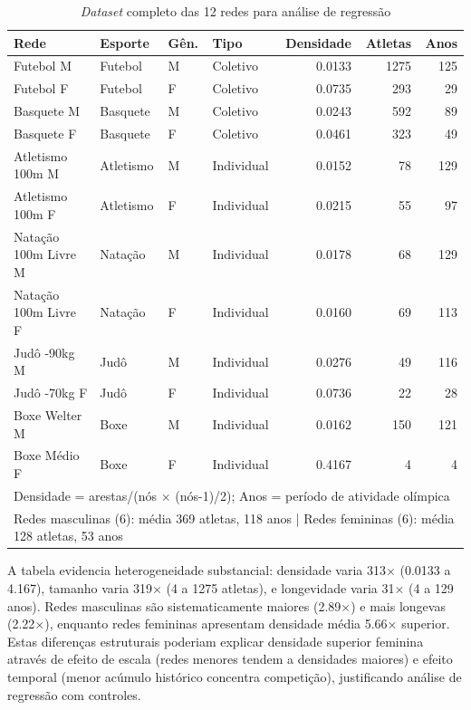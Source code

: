 \begin{table}[H]
\centering
\small
\caption{\textit{Dataset} completo das 12 redes para análise de regressão}
\label{tab:confounder_data}
\begin{tabular}{llllrrr}
\hline
\textbf{Rede} & \textbf{Esporte} & \textbf{Gên.} & \textbf{Tipo} & \textbf{Densidade} & \textbf{Atletas} & \textbf{Anos} \\
\hline
Futebol M & Futebol & M & Coletivo & 0.0133 & 1275 & 125 \\
Futebol F & Futebol & F & Coletivo & 0.0735 & 293 & 29 \\
Basquete M & Basquete & M & Coletivo & 0.0243 & 592 & 89 \\
Basquete F & Basquete & F & Coletivo & 0.0461 & 323 & 49 \\
Atletismo 100m M & Atletismo & M & Individual & 0.0152 & 78 & 129 \\
Atletismo 100m F & Atletismo & F & Individual & 0.0215 & 55 & 97 \\
Natação 100m Livre M & Natação & M & Individual & 0.0178 & 68 & 129 \\
Natação 100m Livre F & Natação & F & Individual & 0.0160 & 69 & 113 \\
Judô -90kg M & Judô & M & Individual & 0.0276 & 49 & 116 \\
Judô -70kg F & Judô & F & Individual & 0.0736 & 22 & 28 \\
Boxe Welter M & Boxe & M & Individual & 0.0162 & 150 & 121 \\
Boxe Médio F & Boxe & F & Individual & 0.4167 & 4 & 4 \\
\hline
\multicolumn{7}{l}{\footnotesize Densidade = arestas/(nós × (nós-1)/2); Anos = período de atividade olímpica} \\
\multicolumn{7}{l}{\footnotesize Redes masculinas (6): média 369 atletas, 118 anos | Redes femininas (6): média 128 atletas, 53 anos} \\
\end{tabular}
\end{table}

A tabela evidencia heterogeneidade substancial: densidade varia 313× (0.0133 a 4.167), tamanho varia 319× (4 a 1275 atletas), e longevidade varia 31× (4 a 129 anos). Redes masculinas são sistematicamente maiores (2.89×) e mais longevas (2.22×), enquanto redes femininas apresentam densidade média 5.66× superior. Estas diferenças estruturais poderiam explicar densidade superior feminina através de efeito de escala (redes menores tendem a densidades maiores) e efeito temporal (menor acúmulo histórico concentra competição), justificando análise de regressão com controles.

